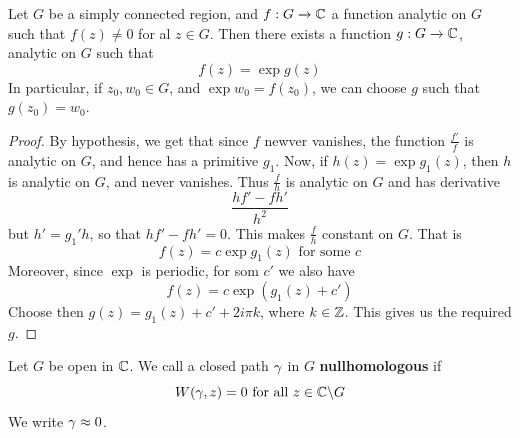 \begin{corollary}
    Let $G$ be a simply connected region, and  $f:G \xrightarrow{} \mathbb{C}$ a
    function analytic on $G$ such that  $f(z) \neq 0$ for al $z \in G$. Then
    there exists a function  $g:G \xrightarrow{} \mathbb{C}$, analytic on $G$ such that
    \begin{equation*}
        f(z)=\exp{g(z)}
    \end{equation*}
    In particular, if $z_0,w_0 \in G$, and $\exp{w_0}=f(z_0)$, we can choose $g$
    such that $g(z_0)=w_0$.
\end{corollary}
\begin{proof}
    By hypothesis, we get that since $f$ newver vanishes, the function
    $\frac{f'}{f}$ is analytic on $G$, and hence has a primitive $g_1$. Now, if
    $h(z)=\exp{g_1(z)}$, then $h$ is analytic on  $G$, and never vanishes. Thus
     $\frac{f}{h}$ is analytic on $G$ and has derivative
     \begin{equation*}
         \frac{hf'-fh'}{h^2}
     \end{equation*}
     but $h'=g_1'h$, so that $hf'-fh'=0$. This makes  $\frac{f}{h}$ constant on
     $G$. That is
     \begin{equation*}
         f(z)=c\exp{g_1(z)} \text{ for some } c
     \end{equation*}
     Moreover, since $\exp$ is periodic, for som  $c'$ we also have
     \begin{equation*}
         f(z)=c\exp{(g_1(z)+c')}
     \end{equation*}
     Choose then $g(z)=g_1(z)+c'+2i\pi{k}$, where $k \in \mathbb{Z}$. This gives us the
     required $g$.
\end{proof}

\begin{definition}
    Let $G$ be open in $\mathbb{C}$. We call a closed path $\gamma$ in $G$
    \textbf{nullhomologous} if
    \begin{equation*}
        W(\gamma,z)=0 \text{ for all } z \in \mathbb{C} \backslash G
    \end{equation*}
    We write
    $\gamma \approx 0$.
\end{definition}
